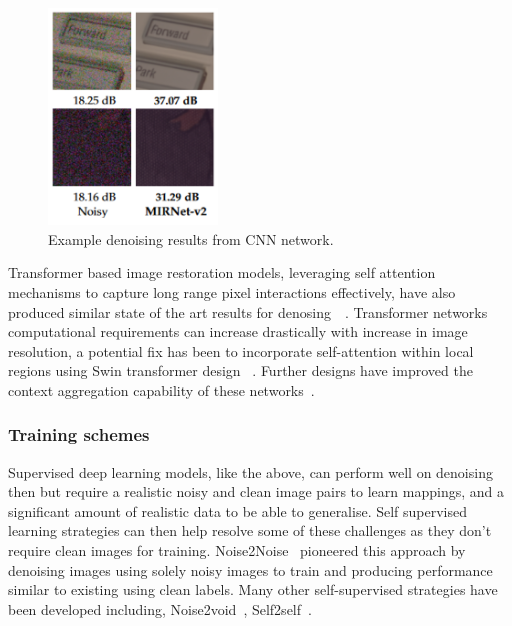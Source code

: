 \documentclass[project-plan]{report-template}
\begin{document}
\begin{figure}[htb]
    \begin{center}
        \includegraphics[width=0.4\textwidth]{latex/figures/noise_removal_ex.png}
    \end{center}
    \caption{\label{fig:example} Example denoising results from CNN network.}
\end{figure}

Transformer based image restoration models, leveraging self attention mechanisms to capture long range pixel interactions effectively, have also produced similar state of the art results for denosing~\cite{zamir2021restormer}~\cite{wang2022uformer}. Transformer networks computational requirements can increase drastically with increase in image resolution, a potential fix has been to incorporate  self-attention within local regions using Swin transformer design ~\cite{wang2022uformer}. Further designs have improved the context aggregation capability of these networks~\cite{zamir2021restormer}.

\subsubsection{Training schemes}
Supervised deep learning models, like the above, can perform well on denoising then but require a realistic noisy and clean image pairs to learn mappings, and a significant amount of realistic data to be able to generalise. Self supervised learning strategies can then help resolve some of these challenges as they don't require clean images for training.
Noise2Noise~\cite{lehtinen2018n2n} pioneered this approach by denoising images using solely noisy images to train and producing performance similar to existing using clean labels. Many other self-supervised strategies have been developed including, Noise2void~\cite{krull2019noise2void}, Self2self~\cite{quan2020self2self}.
\end{document}

